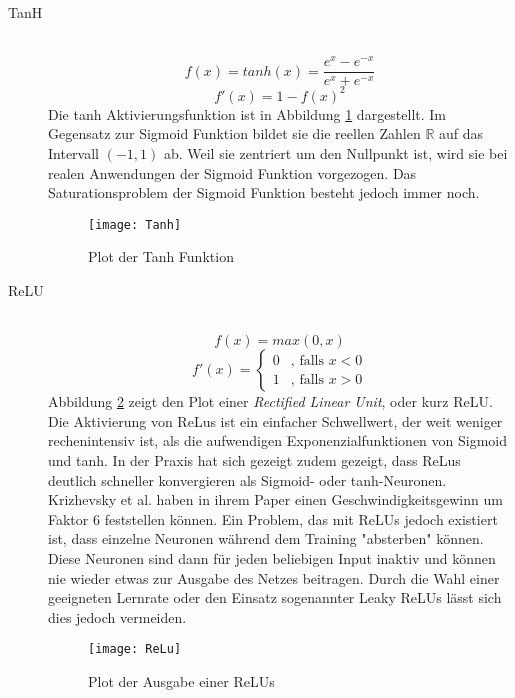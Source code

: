 \begin{description}
	\item[TanH] \hfill \\
		\begin{equation}
			f(x) = tanh(x) = \frac{e^x - e^{-x}}{e^x + e^{-x}}
		\end{equation}
		\begin{equation}
			f'(x) = 1 - f(x)^2
		\end{equation}
		Die tanh Aktivierungsfunktion ist in Abbildung \ref{tanhfunction} dargestellt.
		Im Gegensatz zur Sigmoid Funktion bildet sie die reellen Zahlen $\mathbb{R}$ auf das Intervall $(-1, 1)$ ab.
		Weil sie zentriert um den Nullpunkt ist, wird sie bei realen Anwendungen der Sigmoid Funktion vorgezogen.
		Das Saturationsproblem der Sigmoid Funktion besteht jedoch immer noch.
		\begin{figure}
			\centering
			\texttt{[image: Tanh]}
			\caption{Plot der Tanh Funktion}
			\label{tanhfunction}
		\end{figure}
	
	\item[ReLU] \hfill \\
		\begin{equation}
			f(x) = max(0, x)
		\end{equation}
		\begin{equation*}
			f'(x) = \begin{cases}
			0 &\text{, falls $x < 0$}\\
			1 &\text{, falls $x > 0$}
			\end{cases}
		\end{equation*}
		Abbildung \ref{reluoutput} zeigt den Plot einer \textit{Rectified Linear Unit}, oder kurz ReLU.
		Die Aktivierung von ReLus ist ein einfacher Schwellwert, der weit weniger rechenintensiv ist, als die aufwendigen Exponenzialfunktionen von Sigmoid und tanh.
		In der Praxis hat sich gezeigt zudem gezeigt, dass ReLus deutlich schneller konvergieren als Sigmoid- oder tanh-Neuronen. 
		Krizhevsky et al. haben in ihrem Paper\cite{NIPS2012_4824} einen Geschwindigkeitsgewinn um Faktor 6 feststellen können.
		Ein Problem, das mit ReLUs jedoch existiert ist, dass einzelne Neuronen während dem Training "absterben" können.
		Diese Neuronen sind dann für jeden beliebigen Input inaktiv und können nie wieder etwas zur Ausgabe des Netzes beitragen.
		Durch die Wahl einer geeigneten Lernrate oder den Einsatz sogenannter Leaky ReLUs lässt sich dies jedoch vermeiden.
		

		\begin{figure}
			\centering
			\texttt{[image: ReLu]}
			\caption{Plot der Ausgabe einer ReLUs}
			\label{reluoutput}
		\end{figure}



\end{description}

